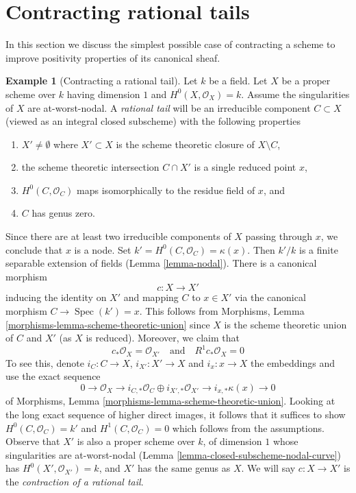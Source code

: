 \documentclass{stacks-project}
\theoremstyle{plain}
\theoremstyle{definition}
\newtheorem{example}[subsection]{Example}
\theoremstyle{remark}
\numberwithin{equation}{subsection}
\def\Spec{\mathop{\mathrm{Spec}}}
\begin{document}
\section{Contracting rational tails}
\label{section-contracting-rational-tails}

\noindent
In this section we discuss the simplest possible case of contracting
a scheme to improve positivity properties of its canonical sheaf.

\begin{example}[Contracting a rational tail]
\label{example-rational-tail}
Let $k$ be a field. Let $X$ be a proper scheme over $k$ having dimension $1$
and $H^0(X, \mathcal{O}_X) = k$. Assume the singularities of $X$ are
at-worst-nodal.
A {\it rational tail} will be an irreducible component $C \subset X$
(viewed as an integral closed subscheme) with the following properties
\begin{enumerate}
\item $X' \not = \emptyset$ where $X' \subset X$ is the scheme theoretic closure
of $X \setminus C$,
\item the scheme theoretic intersection $C \cap X'$ is a single
reduced point $x$,
\item $H^0(C, \mathcal{O}_C)$ maps isomorphically to the
residue field of $x$, and
\item $C$ has genus zero.
\end{enumerate}
Since there are at least two irreducible components of $X$ passing through
$x$, we conclude that $x$ is a node.
Set $k' = H^0(C, \mathcal{O}_C) = \kappa(x)$.
Then $k'/k$ is a finite separable extension of fields
(Lemma \ref{lemma-nodal}). There is a canonical morphism
$$
c : X \longrightarrow X'
$$
inducing the identity on $X'$ and mapping $C$ to $x \in X'$
via the canonical morphism $C \to \Spec(k') = x$. This follows from
Morphisms, Lemma \ref{morphisms-lemma-scheme-theoretic-union}
since $X$ is the scheme theoretic union of $C$ and $X'$ (as $X$ is reduced).
Moreover, we claim that
$$
c_*\mathcal{O}_X = \mathcal{O}_{X'}
\quad\text{and}\quad
R^1c_*\mathcal{O}_X = 0
$$
To see this, denote $i_C : C \to X$, $i_{X'} : X' \to X$ and $i_x : x \to X$
the embeddings and use the exact sequence
$$
0 \to \mathcal{O}_X \to
i_{C, *}\mathcal{O}_C \oplus i_{X', *}\mathcal{O}_{X'} \to
i_{x, *}\kappa(x) \to 0
$$
of Morphisms, Lemma \ref{morphisms-lemma-scheme-theoretic-union}.
Looking at the long exact sequence of higher direct images,
it follows that it suffices to show $H^0(C, \mathcal{O}_C) = k'$
and $H^1(C, \mathcal{O}_C) = 0$ which follows from the assumptions.
Observe that $X'$ is also a proper scheme over $k$, of dimension $1$
whose singularities are at-worst-nodal
(Lemma \ref{lemma-closed-subscheme-nodal-curve})
has $H^0(X', \mathcal{O}_{X'}) = k$, and
$X'$ has the same genus as $X$.
We will say $c : X \to X'$ is the
{\it contraction of a rational tail}.
\end{example}
\end{document}
